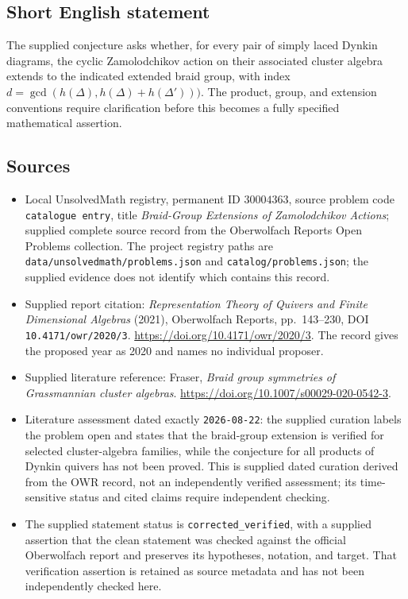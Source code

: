 \documentclass[11pt]{article}
\begin{document}
\subsection{Short English statement}
The supplied conjecture asks whether, for every pair of simply laced Dynkin diagrams, the cyclic Zamolodchikov action on their associated cluster algebra extends to the indicated extended braid group, with index \(d=\gcd(h(\Delta),h(\Delta)+h(\Delta')))\). The product, group, and extension conventions require clarification before this becomes a fully specified mathematical assertion.
\subsection{Sources}
\begin{itemize}
\item Local UnsolvedMath registry, permanent ID \(30004363\), source problem code \texttt{catalogue entry}, title \emph{Braid-Group Extensions of Zamolodchikov Actions}; supplied complete source record from the Oberwolfach Reports Open Problems collection. The project registry paths are \texttt{data/unsolvedmath/problems.json} and \texttt{catalog/problems.json}; the supplied evidence does not identify which contains this record.
\item Supplied report citation: \emph{Representation Theory of Quivers and Finite Dimensional Algebras} (2021), Oberwolfach Reports, pp.~143--230, DOI \texttt{10.4171/owr/2020/3}. \url{https://doi.org/10.4171/owr/2020/3}. The record gives the proposed year as 2020 and names no individual proposer.
\item Supplied literature reference: Fraser, \emph{Braid group symmetries of Grassmannian cluster algebras}. \url{https://doi.org/10.1007/s00029-020-0542-3}.
\item Literature assessment dated exactly \texttt{2026-08-22}: the supplied curation labels the problem open and states that the braid-group extension is verified for selected cluster-algebra families, while the conjecture for all products of Dynkin quivers has not been proved. This is supplied dated curation derived from the OWR record, not an independently verified assessment; its time-sensitive status and cited claims require independent checking.
\item The supplied statement status is \texttt{corrected\_verified}, with a supplied assertion that the clean statement was checked against the official Oberwolfach report and preserves its hypotheses, notation, and target. That verification assertion is retained as source metadata and has not been independently checked here.
\end{itemize}
\end{document}
